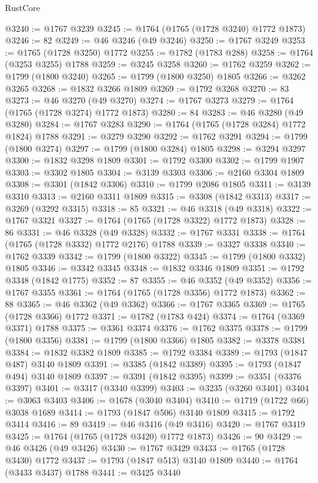 \begin{lexlean}{RustCore}
\begin{coremodule}
@3240 := @1767 @3239
@3245 := @1764 (@1765 (@1728 @3240) @1772 @1873)
@3246 := 82
@3249 := @46 @3246 (@49 @3246)
@3250 := @1767 @3249
@3253 := @1765 (@1728 @3250) @1772
@3255 := @1782 (@1783 @288)
@3258 := @1764 (@3253 @3255) @1788
@3259 := @3245 @3258
@3260 := @1762 @3259
@3262 := @1799 (@1800 @3240)
@3265 := @1799 (@1800 @3250) @1805
@3266 := @3262 @3265
@3268 := @1832 @3266 @1809
@3269 := @1792 @3268
@3270 := 83
@3273 := @46 @3270 (@49 @3270)
@3274 := @1767 @3273
@3279 := @1764 (@1765 (@1728 @3274) @1772 @1873)
@3280 := 84
@3283 := @46 @3280 (@49 @3280)
@3284 := @1767 @3283
@3290 := @1764 (@1765 (@1728 @3284) @1772 @1824) @1788
@3291 := @3279 @3290
@3292 := @1762 @3291
@3294 := @1799 (@1800 @3274)
@3297 := @1799 (@1800 @3284) @1805
@3298 := @3294 @3297
@3300 := @1832 @3298 @1809
@3301 := @1792 @3300
@3302 := @1799 @1907
@3303 := @3302 @1805
@3304 := @3139 @3303
@3306 := @2160 @3304 @1809
@3308 := @3301 (@1842 @3306)
@3310 := @1799 @2086 @1805
@3311 := @3139 @3310
@3313 := @2160 @3311 @1809
@3315 := @3308 (@1842 @3313)
@3317 := @3269 (@3292 @3315)
@3318 := 85
@3321 := @46 @3318 (@49 @3318)
@3322 := @1767 @3321
@3327 := @1764 (@1765 (@1728 @3322) @1772 @1873)
@3328 := 86
@3331 := @46 @3328 (@49 @3328)
@3332 := @1767 @3331
@3338 := @1764 (@1765 (@1728 @3332) @1772 @2176) @1788
@3339 := @3327 @3338
@3340 := @1762 @3339
@3342 := @1799 (@1800 @3322)
@3345 := @1799 (@1800 @3332) @1805
@3346 := @3342 @3345
@3348 := @1832 @3346 @1809
@3351 := @1792 @3348 (@1842 @1775)
@3352 := 87
@3355 := @46 @3352 (@49 @3352)
@3356 := @1767 @3355
@3361 := @1764 (@1765 (@1728 @3356) @1772 @1873)
@3362 := 88
@3365 := @46 @3362 (@49 @3362)
@3366 := @1767 @3365
@3369 := @1765 (@1728 @3366) @1772
@3371 := @1782 (@1783 @424)
@3374 := @1764 (@3369 @3371) @1788
@3375 := @3361 @3374
@3376 := @1762 @3375
@3378 := @1799 (@1800 @3356)
@3381 := @1799 (@1800 @3366) @1805
@3382 := @3378 @3381
@3384 := @1832 @3382 @1809
@3385 := @1792 @3384
@3389 := @1793 (@1847 @487) @3140 @1809
@3391 := @3385 (@1842 @3389)
@3395 := @1793 (@1847 @494) @3140 @1809
@3397 := @3391 (@1842 @3395)
@3399 := @3351 (@3376 @3397)
@3401 := @3317 (@3340 @3399)
@3403 := @3235 (@3260 @3401)
@3404 := @3063 @3403
@3406 := @1678 (@3040 @3404)
@3410 := @1719 (@1722 @66) @3038 @1689
@3414 := @1793 (@1847 @506) @3140 @1809
@3415 := @1792 @3414
@3416 := 89
@3419 := @46 @3416 (@49 @3416)
@3420 := @1767 @3419
@3425 := @1764 (@1765 (@1728 @3420) @1772 @1873)
@3426 := 90
@3429 := @46 @3426 (@49 @3426)
@3430 := @1767 @3429
@3433 := @1765 (@1728 @3430) @1772
@3437 := @1793 (@1847 @513) @3140 @1809
@3440 := @1764 (@3433 @3437) @1788
@3441 := @3425 @3440

\end{coremodule}
\end{lexlean}
